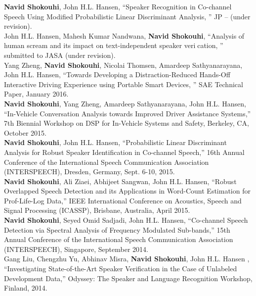 	{\bf Navid Shokouhi}, John H.L. Hansen, ``Speaker Recognition in Co-channel Speech Using Modified Probabilistic Linear Discriminant Analysis, '' JP -- (under revision).\\
	
	 John H.L. Hansen, Mahesh Kumar Nandwana, {\bf Navid Shokouhi}, ``Analysis of human scream
	and its impact on text-independent speaker verication, '' submitted to JASA (under revision).\\
	
	Yang Zheng, {\bf Navid Shokouhi}, Nicolai Thomsen, Amardeep Sathyanarayana, John H.L. Hansen, ``Towards Developing a Distraction-Reduced Hands-Off Interactive Driving Experience using Portable Smart Devices, '' SAE Technical Paper, January 2016. \\
	
	{\bf Navid Shokouhi}, Yang Zheng, Amardeep Sathyanarayana, John H.L. Hansen, ``In-Vehicle Conversation Analysis towards Improved Driver Assistance Systems,'' 7th Biennial Workshop on DSP for In-Vehicle Systems and Safety, Berkeley, CA, October 2015.\\
	
	{\bf Navid Shokouhi}, John H.L. Hansen, ``Probabilistic Linear Discriminant Analysis for Robust Speaker Identification in Co-channel Speech,'' 16th Annual Conference of the International Speech Communication Association (INTERSPEECH), Dresden, Germany, Sept. 6-10, 2015.\\
	
	{\bf Navid Shokouhi}, Ali Ziaei, Abhijeet Sangwan, John H.L. Hansen, ``Robust Overlapped Speech Detection and its Applications in Word-Count Estimation for Prof-Life-Log Data,'' IEEE International Conference on Acoustics, Speech and Signal Processing (ICASSP), Brisbane, Australia, April 2015. \\

	{\bf Navid Shokouhi}, Seyed Omid Sadjadi, John H.L. Hansen, ``Co-channel Speech Detection via Spectral Analysis of Frequency Modulated Sub-bands,'' 15th Annual Conference of the International Speech Communication Association (INTERSPEECH), Singapore, September 2014.\\
	
	Gang Liu, Chengzhu Yu, Abhinav Misra, {\bf Navid Shokouhi}, John H.L. Hansen , ``Investigating State-of-the-Art Speaker Verification in the Case of Unlabeled Development Data,'' Odyssey: The Speaker and Language Recognition Workshop, Finland, 2014.\\
	
